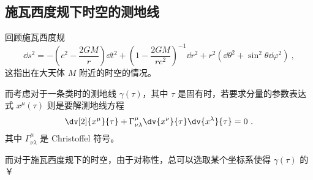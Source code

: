 
\subsection{施瓦西度规下时空的测地线}
回顾施瓦西度规
\begin{equation}
\dd  s^2 = -\left(c^2 - \frac{2GM}{r}\right) \dd t^2+ \left(1-\frac{2GM}{r c^2}\right)^{-1}\dd r^2 + r^2(\dd \theta^2 + \sin^2 \theta \dd \varphi^2) ~,
\end{equation}
这指出在大天体 $M$ 附近的时空的情况。

而考虑对于一条类时的测地线 $\gamma(\tau)$，其中 $\tau$ 是固有时，若要求分量的参数表达式 $x^\mu(\tau)$ 则是要解测地线方程
\begin{equation}
\dv[2]{x^\mu}{\tau} + \Gamma^{\mu}_{\nu \lambda} \dv{x^\nu}{\tau} \dv{x^\lambda}{\tau} = 0~.
\end{equation}
其中 $\Gamma^\mu_{\nu \lambda}$ 是 Christoffel 符号。

而对于施瓦西度规下的时空，由于对称性，总可以选取某个坐标系使得 $\gamma(\tau)$ 的 ￥
